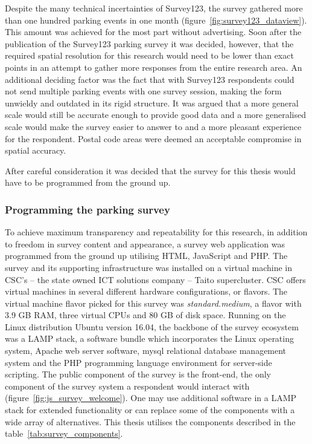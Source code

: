 Despite the many technical incertainties of Survey123, the survey gathered more than one hundred parking events in one month (figure~\ref{fig:survey123_dataview}). This amount was achieved for the most part without advertising. Soon after the publication of the Survey123 parking survey it was decided, however, that the required spatial resolution for this research would need to be lower than exact points in an attempt to gather more responses from the entire research area. An additional deciding factor was the fact that with Survey123 respondents could not send multiple parking events with one survey session, making the form unwieldy and outdated in its rigid structure. It was argued that a more general scale would still be accurate enough to provide good data and a more generalised scale would make the survey easier to answer to and a more pleasant experience for the respondent. Postal code areas were deemed an acceptable compromise in spatial accuracy.

After careful consideration it was decided that the survey for this thesis would have to be programmed from the ground up.

\subsubsection{Programming the parking survey}
\justify
To achieve maximum transparency and repeatability for this research, in addition to freedom in survey content and appearance, a survey web application was programmed from the ground up utilising HTML, JavaScript and PHP. The survey and its supporting infrastructure was installed on a virtual machine in CSC's -- the state owned ICT solutions company -- Taito supercluster. CSC offers virtual machines in several different hardware configurations, or flavors. The virtual machine flavor picked for this survey was \textit{standard.medium}, a flavor with 3.9 \gls{GB} \gls{RAM}, three virtual \gls{CPU}s and 80 GB of disk space. Running on the Linux distribution Ubuntu version 16.04, the backbone of the survey ecosystem was a LAMP stack, a software bundle which incorporates the Linux operating system, Apache web server software, \gls{mysql} relational database management system and the PHP programming language environment for server-side scripting. The public component of the survey is the front-end, the only component of the survey system a respondent would interact with (figure~\ref{fig:js_survey_welcome}). One may use additional software in a LAMP stack for extended functionality or can replace some of the components with a wide array of alternatives. This thesis utilises the components described in the table~\ref{tab:survey_components}.

